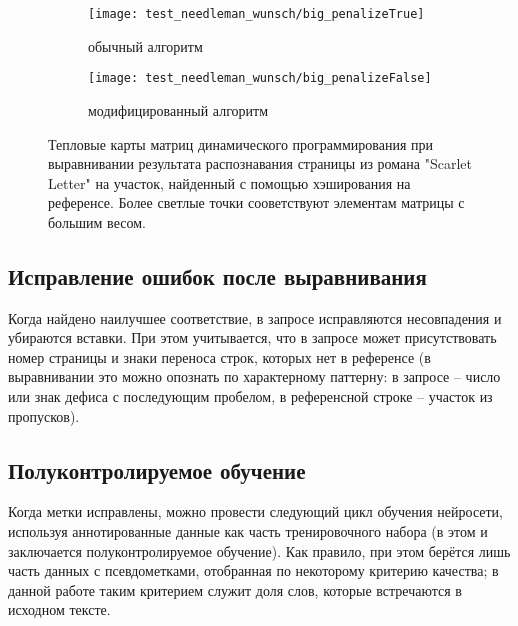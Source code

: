 \documentclass{main.tex}[subfiles]
\begin{document}
\begin{figure}[H]
    \centering
    \begin{subfigure}{.5\textwidth}
        \centering
        \texttt{[image: test\_needleman\_wunsch/big\_penalizeTrue]}
        \caption{обычный алгоритм}
        \label{fig:needleman_real:usual}
    \end{subfigure}%
    \begin{subfigure}{.5\textwidth}
        \centering
        \texttt{[image: test\_needleman\_wunsch/big\_penalizeFalse]}
        \caption{модифицированный алгоритм}
        \label{fig:needleman_real:modified}
    \end{subfigure}
    \caption{Тепловые карты матриц динамического программирования при выравнивании результата распознавания страницы из романа "Scarlet Letter"\hspace{0pt} на участок, найденный с помощью хэширования на референсе.
    Более светлые точки сооветствуют элементам матрицы с большим весом.}
    \label{fig:needleman_real}
\end{figure}


\subsection{Исправление ошибок после выравнивания}

Когда найдено наилучшее соответствие, в запросе исправляются несовпадения и убираются вставки.
При этом учитывается, что в запросе может присутствовать номер страницы и знаки переноса строк, которых нет в референсе (в выравнивании это можно опознать по характерному паттерну: в запросе -- число или знак дефиса с последующим пробелом, в референсной строке -- участок из пропусков).

\subsection{Полуконтролируемое обучение}

Когда метки исправлены, можно провести следующий цикл обучения нейросети, используя аннотированные данные как часть тренировочного набора (в этом и заключается полуконтролируемое обучение).
Как правило, при этом берётся лишь часть данных с псевдометками, отобранная по некоторому критерию качества; в данной работе таким критерием служит доля слов, которые встречаются в исходном тексте.
\end{document}
